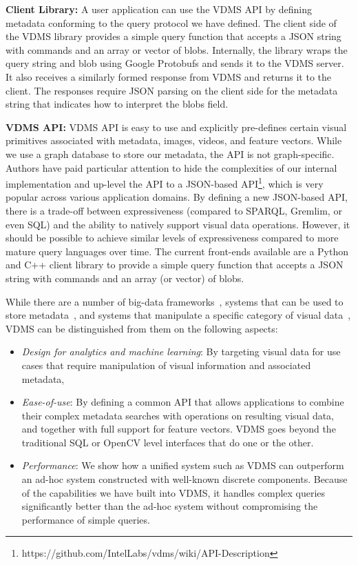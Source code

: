 \textbf{Client Library:}
A user application can use the VDMS API by defining metadata conforming to the
query protocol we have defined.
The client side of the VDMS library provides a simple query function that
accepts a JSON string with commands and an array or vector of blobs.
Internally, the library wraps the query string and blob using
Google Protobufs \cite{protobufs} and sends it to the VDMS server.
It also receives a similarly formed response from VDMS
and returns it to the client. The responses require JSON parsing on the client
side for the metadata string that indicates how to interpret the blobs field.

\textbf{VDMS API:}
VDMS API is easy to use and explicitly pre-defines certain
visual primitives associated with metadata, images, videos, and feature vectors.
While we use a graph database to store our metadata,
the API is not graph-specific.
Authors have paid particular attention to hide the complexities of our internal
implementation and up-level the API to a JSON-based
API\footnote{https://github.com/IntelLabs/vdms/wiki/API-Description},
which is very popular across various application domains.
By defining a new JSON-based API, there is a trade-off between
expressiveness (compared to SPARQL, Gremlim, or even SQL) and
the ability to natively support visual data operations.
However, it should be possible to achieve similar levels of
expressiveness compared to more mature query languages over time.
The current front-ends available are a Python and C++ client
library to provide a simple query function that accepts a JSON string with
commands and an array (or vector) of blobs.

While there are a number of big-data frameworks~\cite{spark, hadoop}, systems
that can be used to store metadata~\cite{memsql, vertica}, and systems that
manipulate a specific category of visual data~\cite{scidb, rasdaman}, VDMS can
be distinguished from them on the following aspects:

\begin{itemize}
\item {\em Design for analytics and machine learning}: By targeting
visual data for use cases that require manipulation
of visual information and associated metadata,
\item {\em Ease-of-use}: By defining a common API that allows applications to
combine their complex metadata searches with operations on resulting visual
data, and together with full support for feature vectors. VDMS goes beyond the
traditional SQL or OpenCV level interfaces that do one or the other.
\item {\em Performance}: We show how a unified system such as VDMS can
outperform an ad-hoc system constructed with well-known discrete components.
Because of the capabilities we have built into VDMS, it handles complex
queries significantly better than the ad-hoc system without compromising the
performance of simple queries.
\end{itemize}

